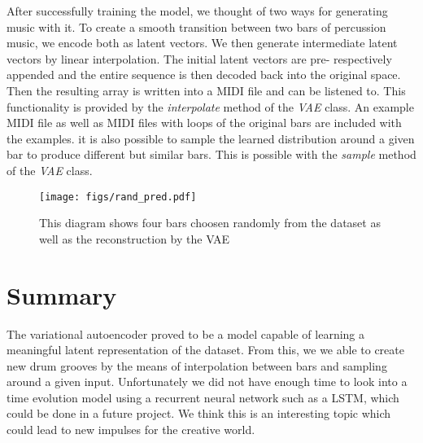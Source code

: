 \documentclass[journal]{Imperial_lab_report}
\begin{document}
After successfully training the model, we thought of two ways for generating music with it. To create a smooth transition between two bars of percussion music, we encode both as latent vectors. We then generate intermediate latent vectors by linear interpolation. The initial latent vectors are pre- respectively appended and the entire sequence is then decoded back into the original space. Then the resulting array is written into a MIDI file and can be listened to. This functionality is provided by the \emph{interpolate} method of the \emph{VAE} class. An example MIDI file as well as MIDI files with loops of the original bars are included with the examples.
it is also possible to sample the learned distribution around a given bar to produce different but similar bars. This is possible with the \emph{sample} method of the \emph{VAE} class.
\begin{figure}
    \centering
    \texttt{[image: figs/rand\_pred.pdf]}
    \caption{This diagram shows four bars choosen randomly from the dataset as well as the reconstruction by the VAE}
    \label{fig:rand_pred}
\end{figure}

\section{Summary}
The variational autoencoder proved to be a model capable of learning a meaningful latent representation of the dataset. From this, we we able to create new drum grooves by the means of interpolation between bars and sampling around a given input. Unfortunately we did not have enough time to look into a time evolution model using a recurrent neural network such as a LSTM, which could be done in a future project. We think this is an interesting topic which could lead to new impulses for the creative world.


\end{document}
